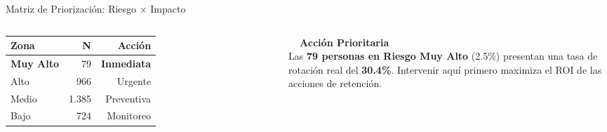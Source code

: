\documentclass[aspectratio=169,12pt]{beamer}
\newcommand{\hallabox}[3]{%
  \begin{tcolorbox}[
    enhanced,
    colback=White,
    colframe=#1,
    arc=3pt,
    boxrule=1pt,
    borderline west={3pt}{0pt}{#1},
    left=6pt, right=4pt, top=3pt, bottom=3pt
  ]
    {\color{#1}\small\bfseries #2}\\[-2pt]
    {\small #3}
  \end{tcolorbox}%
}
\begin{document}
\begin{frame}{Matriz de Priorización: Riesgo × Impacto}
\begin{columns}[T]
      \vspace{4pt}
      \small
      \begin{tabular}{@{}lrr@{}}
        \toprule
        \rowcolor{NavyDeep}
          \color{White}\textbf{Zona} &
          \color{White}\textbf{N} &
          \color{White}\textbf{Acción} \\
        \midrule
        \rowcolor{RedRisk!20}\textbf{Muy Alto} &  79 & \textbf{Inmediata} \\
        \rowcolor{Amber!15}  Alto           & 966 & Urgente \\
        \rowcolor{Gold!10}   Medio          & 1.385 & Preventiva \\
        \rowcolor{GreenOK!10}Bajo           & 724 & Monitoreo \\
        \bottomrule
      \end{tabular}
      \vspace{8pt}
      \hallabox{RedRisk}{\faRocket\ \ Acción Prioritaria}{%
        Las \textbf{79 personas en Riesgo Muy Alto}
        (2.5\%) presentan una tasa de rotación real del \textbf{30.4\%}.
        Intervenir aquí primero maximiza
        el ROI de las acciones de retención.}
  \end{columns}
\end{frame}
\end{document}
